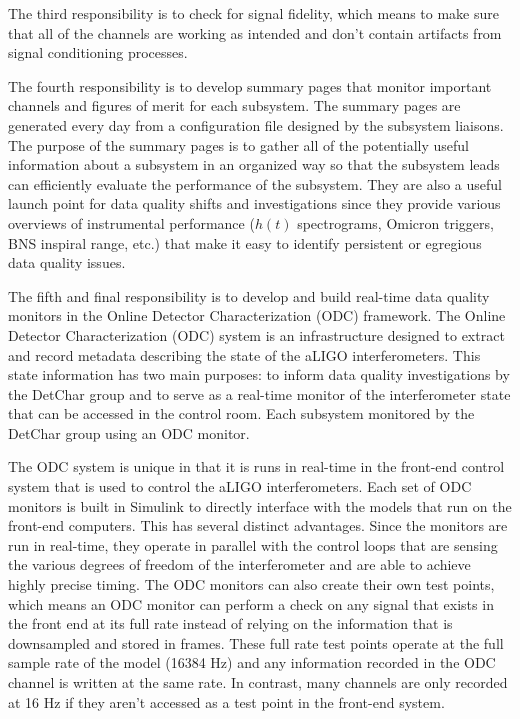 The third responsibility 
is to check for signal fidelity, which means to make sure that all of the 
channels are working as intended and don't contain artifacts from signal 
conditioning processes.

The fourth responsibility is to develop summary pages that monitor 
important channels and figures of merit for each subsystem. 
The summary pages are generated 
every day from a configuration file designed by the subsystem liaisons. 
The purpose of the summary pages is to gather all of the potentially 
useful information about a subsystem in an organized way so that the 
subsystem leads can efficiently evaluate the performance of the subsystem. 
They are also a useful launch point for data quality shifts and 
investigations since they provide various overviews of instrumental 
performance ($h(t)$ spectrograms, Omicron triggers, BNS inspiral range, etc.) 
that make it easy to identify persistent or egregious data quality issues.

The fifth and final responsibility is to develop and build real-time 
data quality monitors in the Online Detector Characterization (ODC) 
framework. 
The Online Detector Characterization (ODC) system is an infrastructure designed
to extract and record metadata describing the state of the aLIGO interferometers.
This state information has two main purposes: to inform data quality investigations
by the DetChar group and to serve as a real-time monitor of the interferometer state
that can be accessed in the control room. Each subsystem monitored by the DetChar group
using an ODC monitor.

The ODC system is unique in that it is runs in real-time in the front-end control
system that is used to control the aLIGO interferometers. Each set of ODC monitors
is built in Simulink to directly interface with the models that run on the front-end
computers. This has several distinct advantages.
Since the monitors are run in real-time, they operate in parallel with the control
loops that are sensing the various degrees of freedom of the interferometer and are
able to achieve highly precise timing. The ODC monitors can also create their own
test points, which means an ODC monitor can perform a check on any signal that exists
in the front end at its full rate instead of relying on the information that is
downsampled and stored in frames.
These full rate test points operate at the full sample rate of the model (16384 Hz)
and any information recorded in the ODC channel is written at the same rate. In contrast,
many channels are only recorded at 16 Hz if they aren't accessed as a test point in the front-end system.

